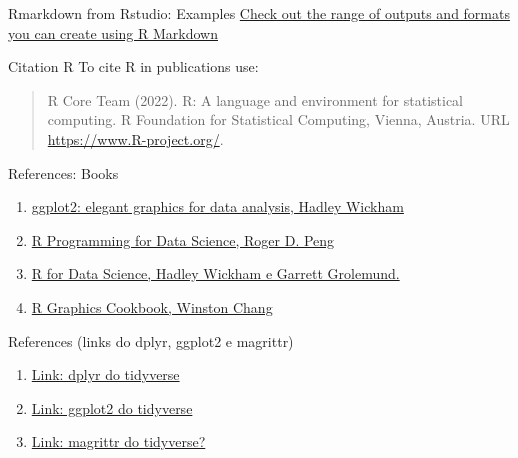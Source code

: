 \documentclass[
  ignorenonframetext,
]{beamer}
\begin{document}
\begin{frame}{Rmarkdown from Rstudio: Examples}
\protect\hypertarget{rmarkdown-from-rstudio-examples}{}
\href{https://rmarkdown.rstudio.com/gallery}{Check out the range of
outputs and formats you can create using R Markdown}
\end{frame}

\begin{frame}{Citation R}
\protect\hypertarget{citation-r}{}
To cite R in publications use:

\begin{quote}
R Core Team (2022). R: A language and environment for statistical
computing. R Foundation for Statistical Computing, Vienna, Austria. URL
\url{https://www.R-project.org/}.
\end{quote}
\end{frame}

\begin{frame}{References: Books}
\protect\hypertarget{references-books}{}
\begin{enumerate}[<+->]
[1)]
\item
  \href{https://ggplot2-book.org/}{ggplot2: elegant graphics for data
  analysis, Hadley Wickham}
\item
  \href{https://bookdown.org/rdpeng/rprogdatascience/}{R Programming for
  Data Science, Roger D. Peng}
\item
  \href{https://r4ds.had.co.nz/}{R for Data Science, Hadley Wickham e
  Garrett Grolemund.}
\item
  \href{https://r-graphics.org/}{R Graphics Cookbook, Winston Chang}
\end{enumerate}
\end{frame}

\begin{frame}{References (links do dplyr, ggplot2 e magrittr)}
\protect\hypertarget{references-links-do-dplyr-ggplot2-e-magrittr}{}
\begin{enumerate}[<+->]
[1)]
\item
  \href{https://dplyr.tidyverse.org/}{Link: dplyr do tidyverse}
\item
  \href{https://ggplot2.tidyverse.org/}{Link: ggplot2 do tidyverse}
\item
  \href{https://magrittr.tidyverse.org/}{Link: magrittr do tidyverse?}
\end{enumerate}
\end{frame}
\end{document}
